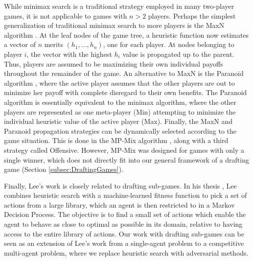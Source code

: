 \documentclass[letterpaper]{article}
\numberwithin{equation}{section}
\numberwithin{theorem}{section}
\numberwithin{lemma}{section}
\numberwithin{df}{section}
\begin{document}
While minimax search is a traditional strategy employed in many two-player games, it is not applicable to games with $n > 2$ players.  Perhaps the simplest generalization of traditional minimax search to more players is the MaxN algorithm \cite{MaxN}.  At the leaf nodes of the game tree, a heuristic function now estimates a vector of $n$ merits $(h_1, ..., h_n)$, one for each player.  At nodes belonging to player $i$, the vector with the highest $h_i$ value is propagated up to the parent.  Thus, players are assumed to be maximizing their own individual payoffs throughout the remainder of the game.  An alternative to MaxN is the Paranoid algorithm \cite{Paranoid}, where the active player assumes that the other players are out to minimize her payoff with complete disregard to their own benefits.  The Paranoid algorithm is essentially equivalent to the minimax algorithm, where the other players are represented as one meta-player (Min) attempting to minimize the individual heuristic value of the active player (Max).  Finally, the MaxN and Paranoid propagation strategies can be dynamically selected according to the game situation.  This is done in the MP-Mix algorithm \cite{ZuckFelnerKraus2009}, along with a third strategy called Offensive.  However, MP-Mix was designed for games with only a single winner, which does not directly fit into our general framework of a drafting game (Section \ref{subsec:DraftingGames}).


Finally, Lee's work is closely related to drafting sub-games.  In his thesis \cite{GregLeeThesis}, Lee combines heuristic search with a machine-learned fitness function to pick a set of actions from a large library, which an agent is then restricted to in a Markov Decision Process.  The objective is to find a small set of actions which enable the agent to behave as close to optimal as possible in its domain, relative to having access to the entire library of actions.  Our work with drafting sub-games can be seen as an extension of Lee's work from a single-agent problem to a competitive multi-agent problem, where we replace heuristic search with adversarial methods. 

\end{document}
